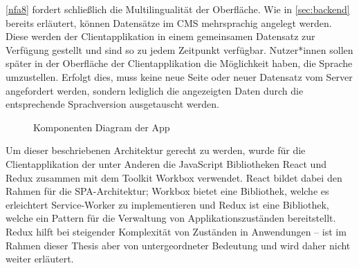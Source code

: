 \ref{nfa8} fordert schließlich die Multilingualität der Oberfläche. Wie in \autoref{sec:backend} 
bereits erläutert, können Datensätze im CMS mehrsprachig angelegt werden. Diese werden der Clientapplikation
in einem gemeinsamen Datensatz zur Verfügung gestellt und sind so zu jedem Zeitpunkt verfügbar. 
Nutzer*innen sollen später in der Oberfläche der Clientapplikation die Möglichkeit haben, die Sprache
umzustellen. Erfolgt dies, muss keine neue Seite oder neuer Datensatz vom Server angefordert werden, sondern lediglich
die angezeigten Daten durch die entsprechende Sprachversion ausgetauscht werden.\\

\begin{figure}
    \centering
    
    \caption{Komponenten Diagram der \shst{} App}
    \label{fig:ss-app-class-diagram}
\end{figure}

Um dieser beschriebenen Architektur gerecht zu werden, wurde für die Clientapplikation der \shst{} 
unter Anderen die JavaScript Bibliotheken React \cite{react} und Redux \cite{redux} zusammen mit dem 
Toolkit Workbox \cite{workbox} verwendet. React bildet dabei
den Rahmen für die SPA-Architektur; Workbox bietet eine Bibliothek, welche es erleichtert 
Service-Worker zu implementieren und Redux ist eine Bibliothek, welche ein Pattern für die Verwaltung 
von Applikationszuständen bereitstellt. Redux hilft bei steigender Komplexität von 
Zuständen in Anwendungen -- ist im Rahmen dieser Thesis aber von untergeordneter Bedeutung und wird daher
nicht weiter erläutert.\\

